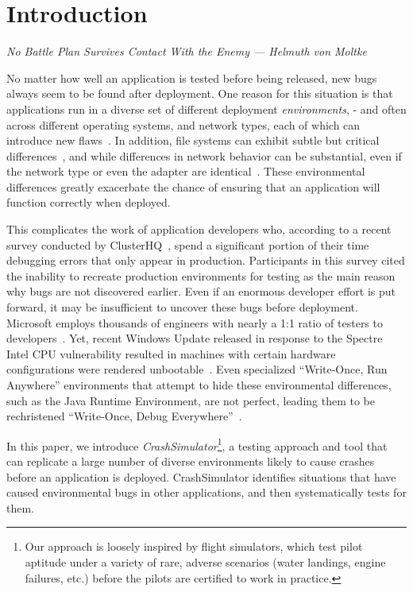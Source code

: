 \section{Introduction}
\label{SEC:introduction}
\textit{No Battle Plan Survives Contact With the Enemy --- Helmuth von Moltke}

No matter how well an application is tested before being released, new bugs
always seem to be found after deployment.  One reason for this situation
is that applications run in a diverse set of
different deployment \emph{environments}, - and often
across different operating systems, and network types,
each of which can introduce new flaws~\cite{LinuxGlibcChanges}.
In addition, file
systems can exhibit subtle but critical
differences~\cite{EXT4Layout, AppleHFS}, and while differences in network
behavior can
be substantial, even if the network type or even the
adapter are identical~\cite{vbox}. These environmental differences greatly
exacerbate the chance of ensuring that an application will function
correctly when deployed.

This complicates the work of application developers who, according to a
recent survey conducted by ClusterHQ~\cite{ClusterHQSurvey},
spend a significant portion of their time
debugging errors that only appear in production.
Participants in this survey cited the inability to recreate
production environments for
testing as the main reason why bugs are not discovered earlier.
Even if an
enormous developer effort is put forward, it may be insufficient
to uncover these bugs
before deployment.  Microsoft employs thousands of engineers with nearly a
1:1 ratio of testers to developers~\cite{Page2009}.
Yet, recent Windows Update released in response
to the Spectre Intel CPU vulnerability resulted in machines with certain
hardware configurations were rendered unbootable~\cite{kb4056892}.  Even
specialized ``Write-Once, Run Anywhere'' environments that attempt to hide
these environmental differences, such as the Java Runtime Environment, are
not perfect, leading them to be rechristened ``Write-Once, Debug
Everywhere''~\cite{WODE}.

In this paper, we introduce {\em CrashSimulator}\footnote{ Our approach is
loosely inspired by flight simulators, which test pilot aptitude under a
variety of rare, adverse scenarios (water landings, engine failures, etc.)
before the pilots are certified to work in practice.}, a testing approach
and tool that can replicate a large
number of diverse environments likely to cause crashes before an
application is deployed.  CrashSimulator identifies
situations that have caused environmental bugs in other applications,
and then systematically tests for them.


